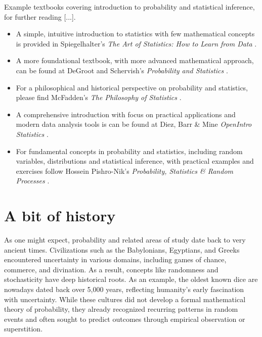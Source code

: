 \documentclass{book}
\begin{document}
\newpage

Example textbooks covering introduction to probability and statistical inference, for further reading [...].

\begin{itemize}
\item A simple, intuitive introduction to statistics with few mathematical concepts is provided in Spiegelhalter's \textit{The Art of Statistics: How to Learn from Data} \cite{spiegelhalter2019art}. 
\item A more foundational textbook, with more advanced mathematical approach, can be found at DeGroot and Schervish's \textit{Probability and Statistics} \cite{degroot2012probability}.   
\item For a philosophical and historical perspective on probability and statistics, please find McFadden's \textit{The Philosophy of Statistics} \cite{mcfadden2011philosophy}.
\item A comprehensive introduction with focus on practical applications and modern data analysis tools is can be found at Diez, Barr \& Mine \textit{OpenIntro Statistics} \cite{openintro2025}.
\item For fundamental concepts in probability and statistics, including random variables, distributions and statistical inference, with practical examples and exercises follow Hossein Pishro-Nik's \textit{Probability, Statistics \& Random Processes} \cite{pishronik2014introduction}.
\end{itemize}

\newpage

\section{A bit of history}

As one might expect, probability and related areas of study date back to very ancient times. Civilizations such as the Babylonians, Egyptians, and Greeks encountered uncertainty in various domains, including games of chance, commerce, and divination. As a result, concepts like randomness and stochasticity have deep historical roots. As an example, the oldest known dice are nowadays dated back over 5,000 years, reflecting humanity's early fascination with uncertainty. While these cultures did not develop a formal mathematical theory of probability, they already recognized recurring patterns in random events and often sought to predict outcomes through empirical observation or superstition.\\
\end{document}
